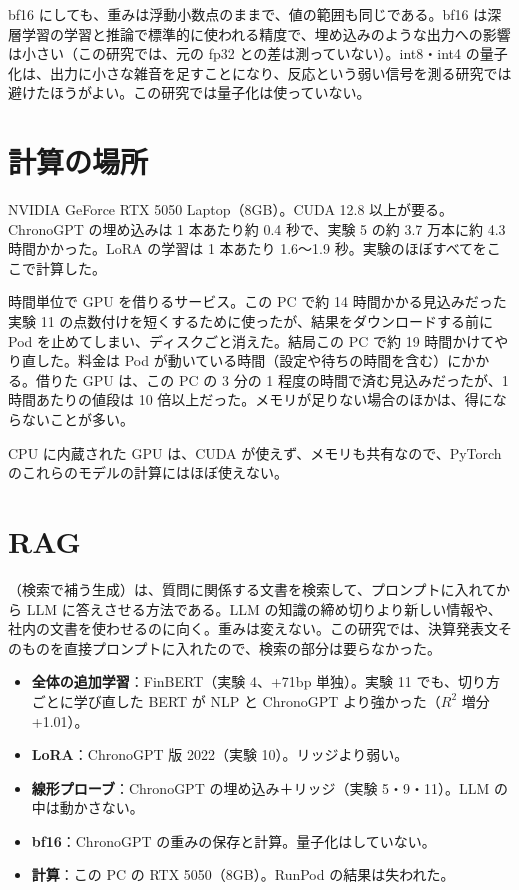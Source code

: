 \begin{notebox}[bf16 は量子化ではない]
bf16 にしても、重みは浮動小数点のままで、値の範囲も同じである。bf16 は深層学習の学習と推論で標準的に使われる精度で、埋め込みのような出力への影響は小さい（この研究では、元の fp32 との差は測っていない）。int8・int4 の量子化は、出力に小さな雑音を足すことになり、反応という弱い信号を測る研究では避けたほうがよい。この研究では量子化は使っていない。
\end{notebox}

\section{計算の場所}

\begin{description}[leftmargin=1.5em,style=nextline,itemsep=0.4em]
\item[この PC の GPU] NVIDIA GeForce RTX 5050 Laptop（8GB）。CUDA 12.8 以上が要る。ChronoGPT の埋め込みは 1 本あたり約 0.4 秒で、実験 5 の約 3.7 万本に約 4.3 時間かかった。LoRA の学習は 1 本あたり 1.6〜1.9 秒。実験のほぼすべてをここで計算した。
\item[借りる GPU（RunPod）] 時間単位で GPU を借りるサービス。この PC で約 14 時間かかる見込みだった実験 11 の点数付けを短くするために使ったが、結果をダウンロードする前に Pod を止めてしまい、ディスクごと消えた。結局この PC で約 19 時間かけてやり直した。料金は Pod が動いている時間（設定や待ちの時間を含む）にかかる。借りた GPU は、この PC の 3 分の 1 程度の時間で済む見込みだったが、1 時間あたりの値段は 10 倍以上だった。メモリが足りない場合のほかは、得にならないことが多い。
\item[内蔵 GPU] CPU に内蔵された GPU は、CUDA が使えず、メモリも共有なので、PyTorch のこれらのモデルの計算にはほぼ使えない。
\end{description}

\section{RAG}

（検索で補う生成）は、質問に関係する文書を検索して、プロンプトに入れてから LLM に答えさせる方法である。LLM の知識の締め切りより新しい情報や、社内の文書を使わせるのに向く。重みは変えない。この研究では、決算発表文そのものを直接プロンプトに入れたので、検索の部分は要らなかった。

\begin{projbox}
\begin{itemize}
\item \textbf{全体の追加学習}：FinBERT（実験 4、+71bp 単独）。実験 11 でも、切り方ごとに学び直した BERT が NLP と ChronoGPT より強かった（$R^2$ 増分 +1.01）。
\item \textbf{LoRA}：ChronoGPT 版 2022（実験 10）。リッジより弱い。
\item \textbf{線形プローブ}：ChronoGPT の埋め込み＋リッジ（実験 5・9・11）。LLM の中は動かさない。
\item \textbf{bf16}：ChronoGPT の重みの保存と計算。量子化はしていない。
\item \textbf{計算}：この PC の RTX 5050（8GB）。RunPod の結果は失われた。
\end{itemize}
\end{projbox}
